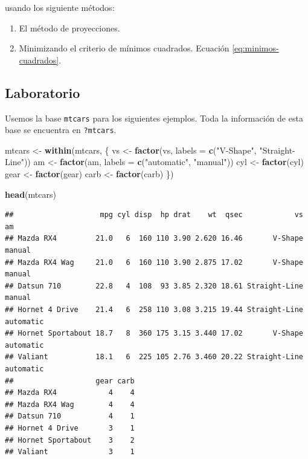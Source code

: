 \documentclass[
  12pt,
]{book}
\newenvironment{Shaded}{\begin{snugshade}}{\end{snugshade}}
\newcommand{\DataTypeTok}[1]{\textcolor[rgb]{0.13,0.29,0.53}{#1}}
\newcommand{\KeywordTok}[1]{\textcolor[rgb]{0.13,0.29,0.53}{\textbf{#1}}}
\newcommand{\NormalTok}[1]{#1}
\newcommand{\StringTok}[1]{\textcolor[rgb]{0.31,0.60,0.02}{#1}}
\providecommand{\tightlist}{%
  \setlength{\itemsep}{0pt}\setlength{\parskip}{0pt}}
\theoremstyle{definition}
\theoremstyle{definition}
\theoremstyle{definition}
\theoremstyle{remark}
\begin{document}
usando los siguiente métodos:

\begin{enumerate}
\def\labelenumi{\arabic{enumi}.}
\tightlist
\item
  El método de proyecciones.
\item
  Minimizando el criterio de mínimos cuadrados. Ecuación \eqref{eq:minimos-cuadrados}.
\end{enumerate}

\hypertarget{laboratorio-1}{%
\subsection{Laboratorio}\label{laboratorio-1}}

Usemos la base \texttt{mtcars} para los siguientes ejemplos. Toda la información de esta base se encuentra en \texttt{?mtcars}.

\begin{Shaded}
\begin{Highlighting}[]
\NormalTok{mtcars <-}\StringTok{ }\KeywordTok{within}\NormalTok{(mtcars, \{}
\NormalTok{    vs <-}\StringTok{ }\KeywordTok{factor}\NormalTok{(vs, }\DataTypeTok{labels =} \KeywordTok{c}\NormalTok{(}\StringTok{"V-Shape"}\NormalTok{, }\StringTok{"Straight-Line"}\NormalTok{))}
\NormalTok{    am <-}\StringTok{ }\KeywordTok{factor}\NormalTok{(am, }\DataTypeTok{labels =} \KeywordTok{c}\NormalTok{(}\StringTok{"automatic"}\NormalTok{, }\StringTok{"manual"}\NormalTok{))}
\NormalTok{    cyl <-}\StringTok{ }\KeywordTok{factor}\NormalTok{(cyl)}
\NormalTok{    gear <-}\StringTok{ }\KeywordTok{factor}\NormalTok{(gear)}
\NormalTok{    carb <-}\StringTok{ }\KeywordTok{factor}\NormalTok{(carb)}
\NormalTok{\})}

\KeywordTok{head}\NormalTok{(mtcars)}
\end{Highlighting}
\end{Shaded}

\begin{verbatim}
##                    mpg cyl disp  hp drat    wt  qsec            vs        am
## Mazda RX4         21.0   6  160 110 3.90 2.620 16.46       V-Shape    manual
## Mazda RX4 Wag     21.0   6  160 110 3.90 2.875 17.02       V-Shape    manual
## Datsun 710        22.8   4  108  93 3.85 2.320 18.61 Straight-Line    manual
## Hornet 4 Drive    21.4   6  258 110 3.08 3.215 19.44 Straight-Line automatic
## Hornet Sportabout 18.7   8  360 175 3.15 3.440 17.02       V-Shape automatic
## Valiant           18.1   6  225 105 2.76 3.460 20.22 Straight-Line automatic
##                   gear carb
## Mazda RX4            4    4
## Mazda RX4 Wag        4    4
## Datsun 710           4    1
## Hornet 4 Drive       3    1
## Hornet Sportabout    3    2
## Valiant              3    1
\end{verbatim}
\end{document}
